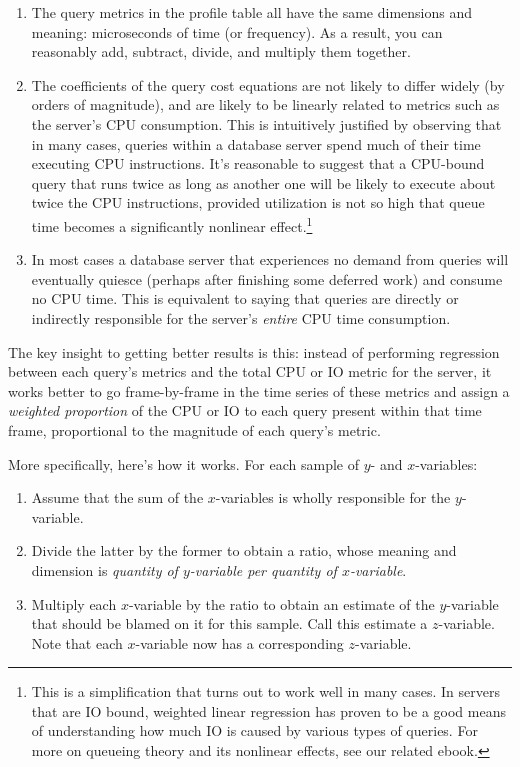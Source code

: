 \documentclass{vivid_layout}
\begin{document}
\begin{enumerate}
\item The query metrics in the profile table all have the same dimensions and meaning: microseconds of time (or frequency). As a result, you can reasonably add, subtract, divide, and multiply them together.
\item The coefficients of the query cost equations are not likely to differ widely (by orders of magnitude), and are likely to be linearly related to metrics such as the server's CPU consumption. This is intuitively justified by observing that in many cases, queries within a database server spend much of their time executing CPU instructions. It's reasonable to suggest that a CPU-bound query that runs twice as long as another one will be likely to execute about twice the CPU instructions, provided utilization is not so high that queue time becomes a significantly nonlinear effect.\footnote{This is a simplification that turns out to work well in many cases. In servers that are IO bound, weighted linear regression has proven to be a good means of understanding how much IO is caused by various types of queries. For more on queueing theory and its nonlinear effects, see our related ebook.}
\item In most cases a database server that experiences no demand from queries will eventually quiesce (perhaps after finishing some deferred work) and consume no CPU time. This is equivalent to saying that queries are directly or indirectly responsible for the server's \emph{entire} CPU time consumption.
\end{enumerate}

The key insight to getting better results is this: instead of performing regression between each query's metrics and the total CPU or IO metric for the server, it works better to go frame-by-frame in the time series of these metrics and assign a \emph{weighted proportion} of the CPU or IO to each query present within that time frame, proportional to the magnitude of each query's metric.

More specifically, here's how it works. For each sample of $y$- and $x$-variables:

\begin{enumerate}
\item Assume that the sum of the $x$-variables is wholly responsible for the $y$-variable.
\item Divide the latter by the former to obtain a ratio, whose meaning and dimension is \emph{quantity of $y$-variable per quantity of $x$-variable}.
\item Multiply each $x$-variable by the ratio to obtain an estimate of the $y$-variable that should be blamed on it for this sample. Call this estimate a $z$-variable. Note that each $x$-variable now has a corresponding $z$-variable.
\end{enumerate}
\end{document}
